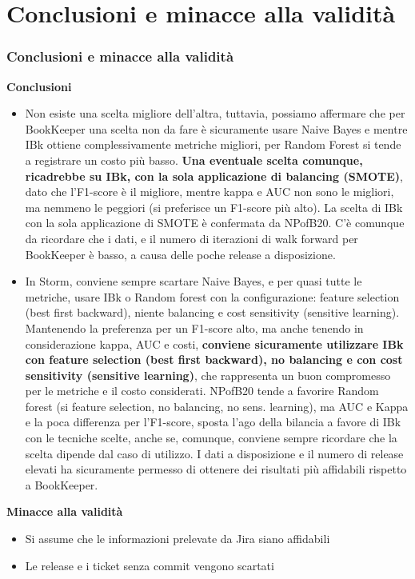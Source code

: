 \documentclass{beamer}
\begin{document}
\section{Conclusioni e minacce alla validità}
\begin{frame}
	\frametitle{Conclusioni e minacce alla validità}
	
	\fontsize{7pt}{8pt}\selectfont
	
	\textbf{Conclusioni}
	
	\begin{itemize}
	
		\item 
		Non esiste una scelta migliore dell'altra, tuttavia, possiamo affermare che per BookKeeper una scelta
		non da fare è sicuramente usare Naive Bayes e mentre IBk ottiene complessivamente metriche migliori, per
		Random Forest si tende a registrare un costo più basso. \textbf{Una eventuale scelta comunque, ricadrebbe su IBk,
		con la sola applicazione di balancing (SMOTE)}, dato che l'F1-score è il migliore, 
		mentre kappa e AUC non sono le
		migliori, ma nemmeno le peggiori (si preferisce un F1-score più alto).
		La scelta di IBk con la sola applicazione di SMOTE è confermata da NPofB20.
		C'è comunque da ricordare che
		i dati, e il numero di iterazioni di walk forward per BookKeeper è basso, a causa delle poche release
		a disposizione.
		
		\item
		In Storm, conviene sempre scartare Naive Bayes, e per quasi tutte le metriche, usare IBk o Random forest
		con la configurazione:
		feature selection (best first backward), niente balancing e cost sensitivity (sensitive learning).
		Mantenendo la preferenza per un F1-score alto, ma anche tenendo in considerazione kappa, AUC e costi,
		\textbf{conviene sicuramente utilizzare IBk con feature selection (best first backward), no balancing e 
		con cost sensitivity (sensitive learning)}, che rappresenta un buon compromesso per le metriche e il costo
		considerati. 
		NPofB20 tende a favorire Random forest (si feature selection, no balancing, no sens. learning),
		ma AUC e Kappa e la poca differenza per l'F1-score, sposta l'ago della bilancia a favore di IBk con le
		tecniche scelte, anche se, comunque, conviene sempre ricordare che la scelta dipende dal
		caso di utilizzo.
		I dati a disposizione e il numero di release elevati ha sicuramente permesso di ottenere dei risultati più
		affidabili rispetto a BookKeeper.
	\end{itemize}
	
	\textbf{Minacce alla validità}
	
	\begin{itemize}
		\item Si assume che le informazioni prelevate da Jira siano affidabili
		\item Le release e i ticket senza commit vengono scartati
	\end{itemize}
	
\end{frame}
\end{document}
